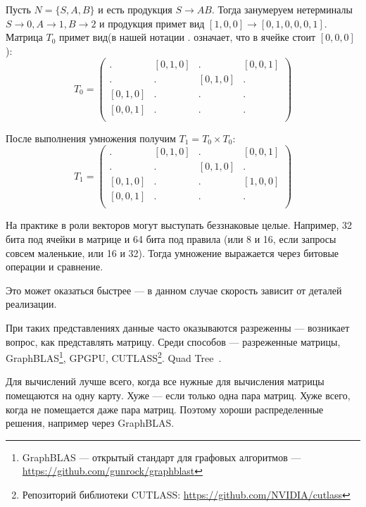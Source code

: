 \begin{example}
Пусть $N = \{S, A, B\}$ и есть продукция $S \to A B$. Тогда занумеруем нетерминалы $ S \to 0, A \to 1, B \to 2$ и продукция примет вид $[1, 0, 0] \to [0, 1, 0, 0, 0, 1]$. Матрица $T_0$ примет вид(в нашей нотации $.$ означает, что в ячейке стоит $[0,0,0]$):
\[
T_0 = \begin{pmatrix}
. & [0,1,0]       & . & [0,0,1]       \\
. & . & [0,1,0]       & . \\
[0,1,0]       & . & . & . \\
[0,0,1]      & . & . & . \\
\end{pmatrix}
\]

После выполнения умножения получим $T_1 = T_0 \times T_0$:
\[
T_1 = \begin{pmatrix}
. & [0,1,0]       & . & [0,0,1]       \\
. & . & [0,1,0]       & . \\
[0,1,0]       & . & . & [1,0,0] \\
[0,0,1]      & . & . & . \\
\end{pmatrix}
\]
\end{example}


На практике в роли векторов могут выступать беззнаковые целые. 
Например, 32 бита под ячейки в матрице и 64 бита под правила (или 8 и 16, если запросы совсем маленькие, или 16 и 32).
Тогда умножение выражается через битовые операции и сравнение.



Это может оказаться быстрее --- в данном случае скорость зависит от деталей реализации.

При таких представлениях данные часто оказываются разреженны --- возникает вопрос, как представлять матрицу. Среди способов --- разреженные матрицы, GraphBLAS\footnote{GraphBLAS --- открытый стандарт для графовых алгоритмов --- \url{https://github.com/gunrock/graphblast} }, GPGPU, CUTLASS\footnote{Репозиторий библиотеки CUTLASS: \url{https://github.com/NVIDIA/cutlass}}.
Quad Tree~\cite{quadtree}.

Для вычислений лучше всего, когда все нужные для вычисления матрицы помещаются на одну карту. Хуже --- если только одна пара матриц. Хуже всего, когда не помещается даже пара матриц. Поэтому хороши распределенные решения, например через GraphBLAS.

